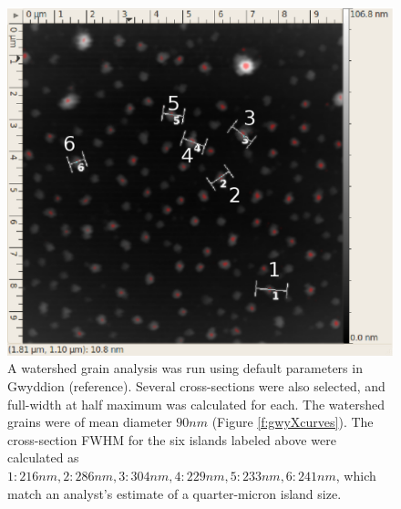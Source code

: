 \documentclass[12pt,oneside,english]{article}
\begin{document}
\lstset{caption=function wraps Gwyddion cross-section data, label=lst:Xdata}



\lstset{caption=function to calculate FWHM from data, label=lst:Fwhm}



	\begin{figure}
	\center
	\includegraphics[width=140mm]{images/gwyddion-cross-sections.eps} 
	\caption{A watershed grain analysis was run using default parameters in Gwyddion (reference).  Several cross-sections were also selected, and full-width at half maximum was calculated for each.  The watershed grains were of mean diameter $90nm$ (Figure \ref{f:gwyXcurves}).  The cross-section FWHM for the six islands labeled above were calculated as $1: 216nm , 2: 286nm , 3: 304nm , 4: 229nm , 5: 233nm , 6: 241nm$, which match an analyst's estimate of a quarter-micron island size.}
	\end{figure}
		
\end{document}
